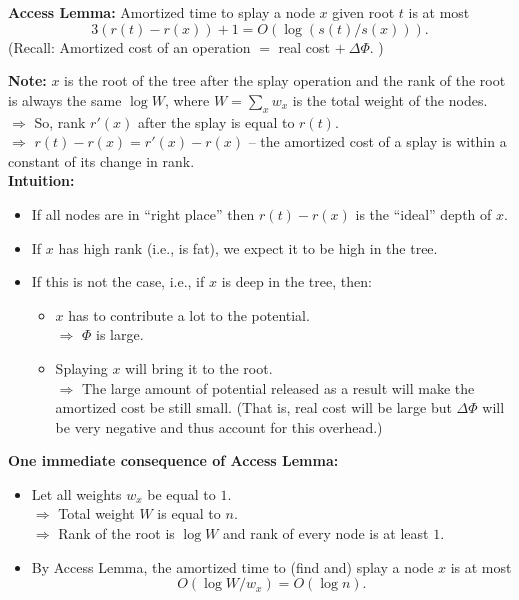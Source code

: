 \documentclass{article}
\begin{document}
\begin{center}
{\bf Access Lemma:} Amortized time to splay a node $x$ given root $t$ is at most
$$3(r(t)-r(x))+1 = O(\log(s(t)/s(x))).$$
(Recall: Amortized cost of an operation $=$ real cost $+ \ \Delta \Phi$. )
\end{center}

{\bf Note:} $x$ is the root of the tree after the splay operation and the rank of the root is always the same $\log W$, where $W=\sum_x w_x$ is the total weight of the nodes.\\
 $\Rightarrow$ So, rank $r'(x)$ after the splay is equal to $r(t)$.\\
 $\Rightarrow$ $r(t)-r(x)=r'(x)-r(x)$ -- the amortized cost of a splay is within a constant of its change in rank.\\

{\bf Intuition:}

\begin{itemize}
\item If all nodes are in ``right place'' then $r(t)-r(x)$ is the ``ideal'' depth of $x$.
\item If $x$ has high rank (i.e., is fat), we expect it to be high in the tree.
\item If this is not the case, i.e., if $x$ is deep in the tree, then: 
\begin{itemize}
\item $x$ has to contribute a lot to the potential.\\
$\Rightarrow$ $\Phi$ is large.
\item Splaying $x$ will bring it to the root.\\
$\Rightarrow$ The large amount of potential released as a result will make 
the amortized cost be still small. (That is, real cost will be large but $\Delta \Phi$ will be very negative and thus account for this overhead.)
\end{itemize}
\end{itemize}

{\bf One immediate consequence of Access Lemma:}
\begin{itemize}
\item Let all weights $w_x$ be equal to $1$.\\
$\Rightarrow$ Total weight $W$ is equal to $n$.\\
$\Rightarrow$ Rank of the root is $\log W$ and rank of every node is at least $1$. 
\item By Access Lemma, the amortized time to (find and) splay a node $x$ is at most 
\[
O(\log W/w_x) = O(\log n).
\]
\end{itemize}
\end{document}

